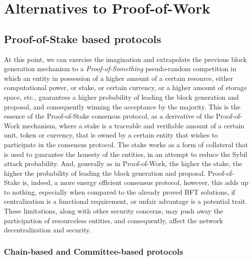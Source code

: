 \documentclass[journal]{IEEEtran}
\begin{document}
\section{Alternatives to Proof-of-Work}

\subsection{Proof-of-Stake based protocols}

At this point, we can exercise the imagination and extrapolate the
previous block generation mechanism to a \emph{Proof-of-Something} 
pseudo-random competition in which an entity in possession of a higher
amount of a certain resource, either computational power, or stake, 
or certain currency, or a higher amount of storage space, etc., guarantees
a higher probability of leading the block generation and proposal, and
consequently winning the acceptance by the majority. This is the essence of
the Proof-of-Stake consensus protocol, as a derivative of the Proof-of-Work
mechanism, where a stake is a traceable and verifiable amount of a certain
unit, token or currency, that is owned by a certain entity that wishes to
participate in the consensus protocol. The stake works as a form of collateral
that is used to guarantee the honesty of the entities, in an attempt to
reduce the Sybil attack probability. And, generally as in Proof-of-Work, 
the higher the stake, the higher the probability of leading the block generation 
and proposal. Proof-of-Stake is, indeed, a more energy efficient consensus protocol,
however, this adds up to nothing, especially when compared to the already proved
BFT solutions, if centralization is a functional requirement, 
or unfair advantage is a potential trait. 
These limitations, along with other security concerns, may push away the 
participation of resourceless entities, and consequently, affect the network
decentralization and security.

\subsubsection{Chain-based and Committee-based protocols}
\end{document}

